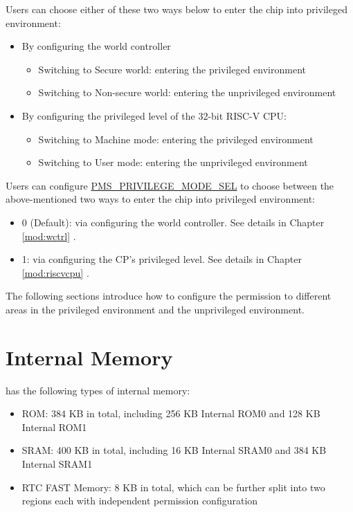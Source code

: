 \documentclass[main\_\_EN.tex]{subfiles}
\begin{document}
Users can choose either of these two ways below to enter the chip into privileged environment:
\begin{itemize}
    \item By configuring the world controller
    \begin{itemize}
        \item Switching to Secure world: entering the privileged environment
        \item Switching to Non-secure world: entering the unprivileged environment
    \end{itemize}
    \item By configuring the privileged level of the 32-bit RISC-V CPU:
    \begin{itemize}
        \item Switching to Machine mode: entering the privileged environment
        \item Switching to User mode: entering the unprivileged environment
    \end{itemize}
\end{itemize}


Users can configure \hyperref[fielddesc:PMSPRIVILEGEMODESEL]{PMS\_PRIVILEGE\_MODE\_SEL} to choose between the above-mentioned two ways to enter the chip into privileged environment:

\begin{itemize}
    \item 0 (Default): via configuring the world controller. See details in Chapter \ref{mod:wctrl} \textit{}.
    \item 1: via configuring the CP's privileged level. See details in Chapter \ref{mod:riscvcpu} \textit{}.
\end{itemize}

The following sections introduce how to configure the permission to different areas in the privileged environment and the unprivileged environment.

\section{Internal Memory}

\chipname{} has the following types of internal memory:
\begin{itemize}
    \item ROM: 384 KB in total, including 256 KB Internal ROM0 and 128 KB Internal ROM1
    \item SRAM: 400 KB in total, including 16 KB Internal SRAM0 and 384 KB Internal SRAM1
    \item RTC FAST Memory: 8 KB in total, which can be further split into two regions each with independent permission configuration
\end{itemize}
\end{document}
